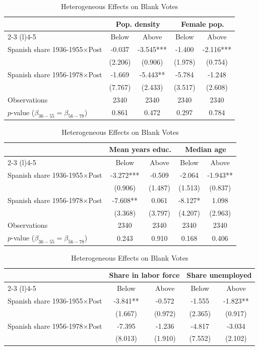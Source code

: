 \begin{table}[!h]
\centering
\renewcommand{\arraystretch}{1.05}
\setlength{\tabcolsep}{8pt}
\captionsetup{justification=centering}
\caption{Heterogeneous Effects on Blank Votes}
\begin{tabular*}{\textwidth}{l@{\extracolsep{\fill}}cccc}
\hline
 & \multicolumn{2}{c}{Pop. density} & \multicolumn{2}{c}{Female pop.} \\
\cmidrule(l){2-3} \cmidrule(l){4-5}
  & Below & Above & Below  & Above \\
\hline
Spanish share 1936-1955$\times$Post & -0.037 & -3.545*** & -1.400 & -2.116***\\
 & (2.206) & (0.906) & (1.978) & (0.754)\\
Spanish share 1956-1978$\times$Post & -1.669 & -5.443** & -5.784 & -1.248\\
 & (7.767) & (2.433) & (3.517) & (2.608)\\

\addlinespace
Observations & 2340 & 2340 & 2340 & 2340\\
$p$-value ($\beta_{36{-}55} = \beta_{56{-}78}$) & 0.861 & 0.472 & 0.297 & 0.784\\
\hline
\end{tabular*}
\begin{tabular*}{\textwidth}{l@{\extracolsep{\fill}}cccc}
 & \multicolumn{2}{c}{Mean years educ.} & \multicolumn{2}{c}{Median age} \\
\cmidrule(l){2-3} \cmidrule(l){4-5}
  & Below & Above & Below  & Above \\
\hline
Spanish share 1936-1955$\times$Post & -3.272*** & -0.509 & -2.064 & -1.943**\\
 & (0.906) & (1.487) & (1.513) & (0.837)\\
Spanish share 1956-1978$\times$Post & -7.608** & 0.061 & -8.127* & 1.098\\
 & (3.368) & (3.797) & (4.207) & (2.963)\\

\addlinespace
Observations & 2340 & 2340 & 2340 & 2340\\
$p$-value ($\beta_{36{-}55} = \beta_{56{-}78}$) & 0.243 & 0.910 & 0.168 & 0.406\\
\hline
\end{tabular*}
\begin{tabular*}{\textwidth}{l@{\extracolsep{\fill}}cccc}
 & \multicolumn{2}{c}{Share in labor force} & \multicolumn{2}{c}{Share unemployed} \\
\cmidrule(l){2-3} \cmidrule(l){4-5}
  & Below & Above & Below  & Above \\
\hline
Spanish share 1936-1955$\times$Post & -3.841** & -0.572 & -1.555 & -1.823**\\
 & (1.667) & (0.972) & (2.365) & (0.917)\\
Spanish share 1956-1978$\times$Post & -7.395 & -1.236 & -4.817 & -3.034\\
 & (8.013) & (1.910) & (7.552) & (2.102)\\


\end{tabular*}
\end{table}
